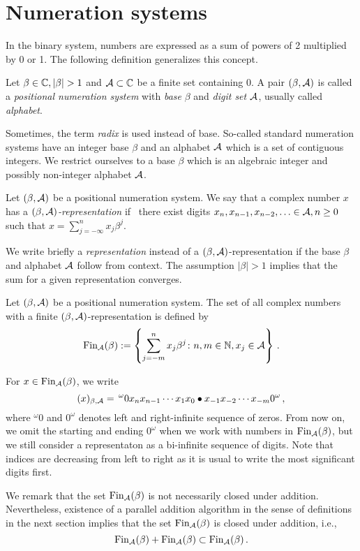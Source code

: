 
\section{Numeration systems}
In the binary system, numbers are expressed as a sum of powers of 2 multiplied by 0 or 1. The following definition generalizes this concept.
\begin{defn}
  Let $\beta \in \CC, |\beta|>1$ and $\mathcal{A} \subset \mathbb{C}$ be a finite set containing 0. A pair $(\beta, \mathcal{A})$ is called a \emph{positional numeration system} with \emph{base} $\beta$ and \emph{digit set} $\mathcal{A}$, usually called \emph{alphabet}.
\end{defn}
Sometimes, the term \emph{radix} is used instead of base. So-called standard numeration systems have an integer base $\beta$ and an alphabet $\mathcal{A}$ which is a set of contiguous integers. We restrict ourselves to a base $\beta$ which is an algebraic integer and possibly non-integer alphabet $\mathcal{A}$. 

\begin{defn}
Let $(\beta, \mathcal{A})$ be a positional numeration system.  We say that a complex number $x$ has a \emph{$(\beta, \mathcal{A})$-representation} if~ there exist digits $x_n,x_{n-1}, x_{n-2},\ldots \in\mathcal{A}, n\geq 0$ such that $x=\sum_{j=-\infty}^n x_j \beta^j$.
\end{defn}
 We write briefly a \emph{representation} instead of a $(\beta, \mathcal{A})$-representation if the base $\beta$ and alphabet $\mathcal{A}$ follow from context. The assumption $|\beta|>1$ implies that the sum for a given representation converges.

\begin{defn}
Let $(\beta, \mathcal{A})$ be a positional numeration system. The set of all complex numbers with a finite $(\beta, \mathcal{A})$-representation is defined by
$$
    \text{Fin}_{\mathcal{A}}(\beta):=\left\{\sum_{j=-m}^n x_j \beta^j\colon n, m \in \mathbb{N}, x_j \in \mathcal{A} \right\}\,.
$$
\end{defn}
   
For  $x\in\text{Fin}_{\mathcal{A}}(\beta)$, we write 
$$
(x)_{\beta,\mathcal{A}}=\,  ^\omega0 x_n x_{n-1}\cdots x_1 x_0 \bullet x_{-1} x_{-2} \cdots x_{-m} 0^\omega\,,
$$ 
where $^\omega0$ and $0^\omega$ denotes left and right-infinite sequence of zeros. From now on, we omit the starting and ending $0^\omega$ when we work with numbers in $\text{Fin}_{\mathcal{A}}(\beta)$, but we still consider a representaton as a bi-infinite sequence of digits. Note that indices are decreasing from left to right as it is usual to write the most significant digits first. 

 We remark that the set $\text{Fin}_{\mathcal{A}}(\beta)$ is not necessarily closed under addition. Nevertheless, existence of a parallel addition algorithm in the sense of definitions in the next section implies that the set $\text{Fin}_{\mathcal{A}}(\beta)$ is closed under addition, i.e.,
$$
\text{Fin}_{\mathcal{A}}(\beta) + \text{Fin}_{\mathcal{A}}(\beta) \subset \text{Fin}_{\mathcal{A}}(\beta)\,.
$$ 

